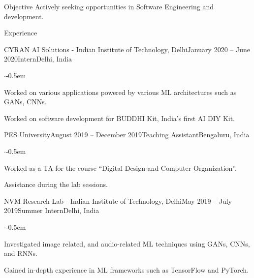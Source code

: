 \documentclass{CV} %
\begin{document}
\begin{rSection}{Objective}
  Actively seeking opportunities in Software Engineering and development.
\end{rSection}




\begin{rSection}{Experience}
  \begin{rSubsection}{CYRAN AI Solutions - Indian Institute of Technology, Delhi}{January 2020 -- June 2020}{Intern}{Delhi, India}
    \begin{list}{$\cdot$}{\footnotesize}\itemsep -0.5em \vspace{-0.5em}
      \item Worked on various applications powered by various ML architectures such as GANs, CNNs.
      \item Worked on software development for BUDDHI Kit, India’s first AI DIY Kit.
    \end{list}
  \end{rSubsection}

  \begin{rSubsection}{PES University}{August 2019 -- December 2019}{Teaching Assistant}{Bengaluru, India}
    \begin{list}{$\cdot$}{\footnotesize}\itemsep -0.5em \vspace{-0.5em}
      \item Worked as a TA for the course ``Digital Design and Computer Organization''.
      \item Assistance during the lab sessions.
    \end{list}
  \end{rSubsection}

  \begin{rSubsection}{NVM Research Lab - Indian Institute of Technology, Delhi}{May 2019 -- July 2019}{Summer Intern}{Delhi, India}
    \begin{list}{$\cdot$}{\footnotesize}\itemsep -0.5em \vspace{-0.5em}
      \item Investigated image related, and audio-related ML techniques using GANs, CNNs, and RNNs.
      \item Gained in-depth experience in ML frameworks such as TensorFlow and PyTorch.
    \end{list}
  \end{rSubsection}


\end{rSection}
\end{document}
